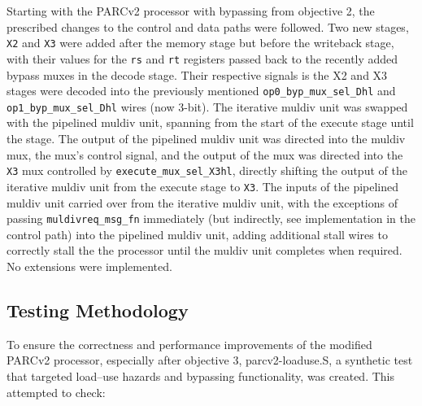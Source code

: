 \documentclass[12pt]{article}
\begin{document}
%
Starting with the PARCv2 processor with bypassing from objective 2, the
prescribed changes to the control and data paths were followed. Two new stages,
\texttt{X2} and \texttt{X3} were added after the memory stage but before the
writeback stage, with their values for the \texttt{rs} and \texttt{rt}
registers passed back to the recently added bypass muxes in the decode stage.
Their respective signals is the X2 and X3 stages were decoded into the
previously mentioned \texttt{op0\_byp\_mux\_sel\_Dhl} and
\texttt{op1\_byp\_mux\_sel\_Dhl} wires (now 3-bit). The iterative muldiv unit
was swapped with the pipelined muldiv unit, spanning from the start of the
execute stage until the  stage. The output of the pipelined muldiv
unit was directed into the muldiv mux, the mux's control signal, and the output
of the mux was directed into the \texttt{X3} mux controlled by
\texttt{execute\_mux\_sel\_X3hl}, directly shifting the output of the iterative
muldiv unit from the execute stage to \texttt{X3}. The inputs of the pipelined
muldiv unit carried over from the iterative muldiv unit, with the exceptions of
passing \texttt{muldivreq\_msg\_fn} immediately (but indirectly, see
implementation in the control path) into the pipelined muldiv unit, adding additional stall wires
to correctly stall the the processor until the muldiv unit completes when required. \\ 

\noindent No extensions were implemented.

\subsection*{Testing Methodology}

To ensure the correctness and performance improvements of the modified PARCv2
processor, especially after objective 3, parcv2-loaduse.S, a synthetic test that targeted
load–use hazards and bypassing functionality, was created. This attempted to check:
\end{document}
